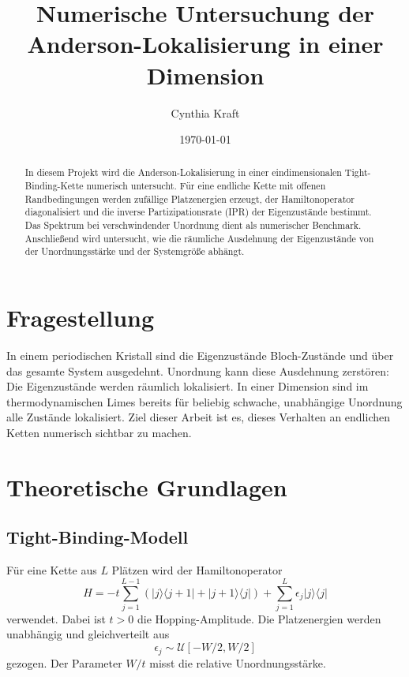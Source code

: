 \documentclass[11pt,a4paper]{article}
\title{Numerische Untersuchung der\\Anderson-Lokalisierung in einer Dimension}
\author{Cynthia Kraft}
\date{\today}
\begin{document}
\maketitle

\begin{abstract}
In diesem Projekt wird die Anderson-Lokalisierung in einer eindimensionalen
Tight-Binding-Kette numerisch untersucht. Für eine endliche Kette mit offenen
Randbedingungen werden zufällige Platzenergien erzeugt, der Hamiltonoperator
diagonalisiert und die inverse Partizipationsrate (IPR) der Eigenzustände
bestimmt. Das Spektrum bei verschwindender Unordnung dient als numerischer
Benchmark. Anschließend wird untersucht, wie die räumliche Ausdehnung der
Eigenzustände von der Unordnungsstärke und der Systemgröße abhängt.
\end{abstract}

\tableofcontents

\section{Fragestellung}
In einem periodischen Kristall sind die Eigenzustände Bloch-Zustände und über
das gesamte System ausgedehnt. Unordnung kann diese Ausdehnung zerstören:
Die Eigenzustände werden räumlich lokalisiert. In einer Dimension sind im
thermodynamischen Limes bereits für beliebig schwache, unabhängige Unordnung
alle Zustände lokalisiert. Ziel dieser Arbeit ist es, dieses Verhalten an
endlichen Ketten numerisch sichtbar zu machen.

\section{Theoretische Grundlagen}
\subsection{Tight-Binding-Modell}
Für eine Kette aus $L$ Plätzen wird der Hamiltonoperator
\begin{equation}
 H=-t\sum_{j=1}^{L-1}\left(
 \lvert j\rangle\langle j+1\rvert+
 \lvert j+1\rangle\langle j\rvert\right)
 +\sum_{j=1}^{L}\epsilon_j\lvert j\rangle\langle j\rvert
\end{equation}
verwendet. Dabei ist $t>0$ die Hopping-Amplitude. Die Platzenergien werden
unabhängig und gleichverteilt aus
\begin{equation}
 \epsilon_j\sim\mathcal{U}[-W/2,W/2]
\end{equation}
gezogen. Der Parameter $W/t$ misst die relative Unordnungsstärke.
\end{document}

